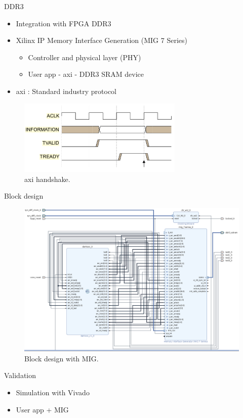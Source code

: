 \begin{frame}{DDR3}
    \begin{itemize}
        \item Integration with FPGA DDR3
        \item Xilinx IP Memory Interface Generation (MIG 7 Series)
    \begin{itemize}
        \item Controller and physical layer (PHY)
        \item User app - \gls{axi} - DDR3 SRAM device
    \end{itemize}
        \item \gls{axi} \cite{axi}: Standard industry protocol
    \end{itemize}
    \begin{figure}
        \centering
        \includegraphics[width=0.7\textwidth]{images/axi.png}
        \caption{\gls{axi} handshake.}
    \end{figure}
\end{frame}


\begin{frame}{Block design}
    \begin{figure}
        \centering
        \includegraphics[width=1.0\textwidth]{images/bd_ddr.png}
        \caption{Block design with MIG.}
    \end{figure}
\end{frame}

\begin{frame}{Validation}
    \begin{itemize}
        \item Simulation with Vivado
        \item User app + MIG
        
    \end{itemize}
\end{frame}

